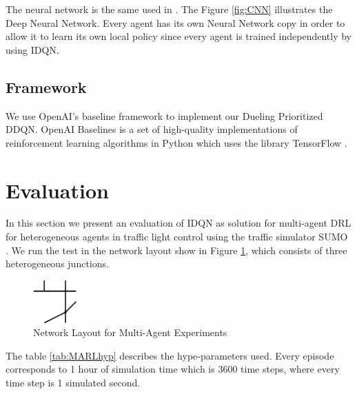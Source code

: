 \documentclass{llncs}
\begin{document}
The neural network is the same used in \cite{Wang2016}. The Figure \ref{fig:CNN} illustrates the Deep Neural Network. Every agent has its own Neural Network copy in order to allow it to learn its own local policy since every agent is trained independently by using IDQN.

\subsection{Framework}

We use OpenAI's baseline framework \cite{baselines} to implement our Dueling Prioritized DDQN. OpenAI Baselines is a set of high-quality implementations of reinforcement learning algorithms in Python which uses the library TensorFlow \cite{Abadi2016}. 

\section{Evaluation}

In this section we present an evaluation of IDQN as solution for multi-agent DRL for heterogeneous agents in traffic light control using the traffic simulator SUMO \cite{SUMO2012}. We run the test in the network layout show in Figure \ref{fig:simSetup}, which consists of three heterogeneous junctions. 

\begin{figure}
\begin{center}
  \includegraphics[width=0.15\textwidth]{images/MARL_env.png}
  \caption{Network Layout for Multi-Agent Experiments}
  \label{fig:simSetup}
\end{center}
\end{figure}

The table \ref{tab:MARLhyp} describes the hype-parameters used. Every episode corresponds to 1 hour of simulation time which is 3600 time steps, where every time step is 1 simulated second.
\end{document}
